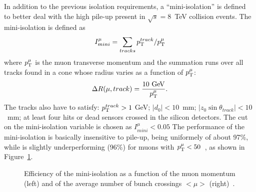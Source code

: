 In addition to the previous isolation requirements, a ``mini-isolation'' is 
defined~\cite{topcommon2013} to better deal with the high pile-up present
in $\sqrt{s} = $8~TeV collision events.
The mini-isolation is defined as 
\begin{equation}\label{eq:miniisol}
I_{mini}^{\mu} = \sum_{tracks} \pt^{track}/\pt^{\mu}
\end{equation}
where $\pt^{\mu}$ is the muon transverse momentum and the summation runs over
all tracks found in a cone whose radius varies as a function of $\pt^{\mu}$:
\begin{equation}\label{eq:minicone}
\Delta R(\mu,track)=\dfrac{10\gev}{\pt^{\mu}}.
\end{equation}
The tracks also have to satisfy: $\pt^{track}>1~$GeV; $|d_0| < 10$~mm;
$|z_0 \sin\theta_{track}| <10$~mm; at least four hits or dead sensors crossed in the silicon detectors.
The cut on the mini-isolation variable is chosen as $I_{mini}^{\mu}<0.05$
The performance of the mini-isolation is basically insensitive to pile-up,
being uniformely of about 97\%, while is slightly underperforming (96\%)
for muons with $\pt^{\mu}<50$~\gev, as 
shown in Figure~\ref{fig:miniisoleff}.

\begin{figure}[tb]\begin{center}
	\caption{Efficiency of the mini-isolation as a function of the muon momentum (left) and of the average number
        of bunch crossings $<\mu>$ (right)~\cite{topcommon2013}.\label{fig:miniisoleff}}
\end{center}\end{figure}


